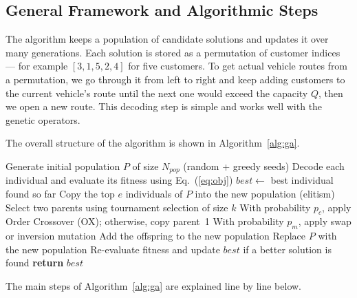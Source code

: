 \documentclass [a4paper, 11pt, titlepage] {article}
\begin{document}
\subsection{General Framework and Algorithmic Steps}

The algorithm keeps a population of candidate solutions and updates it over many generations. Each solution is stored as a permutation of customer indices --- for example $[3, 1, 5, 2, 4]$ for five customers. To get actual vehicle routes from a permutation, we go through it from left to right and keep adding customers to the current vehicle's route until the next one would exceed the capacity $Q$, then we open a new route. This decoding step is simple and works well with the genetic operators.

The overall structure of the algorithm is shown in Algorithm~\ref{alg:ga}.

\begin{algorithm}[H]
\caption{Genetic Algorithm for GVRP}
\label{alg:ga}
\begin{algorithmic}[1]
    \STATE Generate initial population $P$ of size $N_{pop}$ (random + greedy seeds)
    \STATE Decode each individual and evaluate its fitness using Eq.~(\ref{eq:obj})
    \STATE $best \gets$ best individual found so far
        \STATE Copy the top $e$ individuals of $P$ into the new population (elitism)
            \STATE Select two parents using tournament selection of size $k$
            \STATE With probability $p_c$, apply Order Crossover (OX); otherwise, copy parent~1
            \STATE With probability $p_m$, apply swap or inversion mutation
            \STATE Add the offspring to the new population
        \ENDWHILE
        \STATE Replace $P$ with the new population
        \STATE Re-evaluate fitness and update $best$ if a better solution is found
    \ENDWHILE
    \STATE \textbf{return} $best$
\end{algorithmic}
\end{algorithm}

The main steps of Algorithm~\ref{alg:ga} are explained line by line below.
\end{document}

